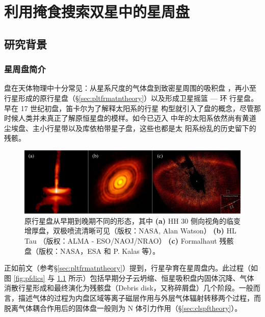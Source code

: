 \chapter{利用掩食搜索双星中的星周盘} \label{chapter:form_evo}

\section{研究背景} \label{sec:diskbackground}

\subsection{星周盘简介} \label{sec:diskintro}

盘在天体物理中十分常见：从星系尺度的气体盘\cite{Binney1987,Gilmore1989}到致密星周围的吸积盘
\cite{Pringle1981}，再小至行星形成的原行星盘（\S \ref{sec:pltfrmatntheory}）以及形成卫星摇篮 --- 环
行星盘\cite{Smith1981,Latter2017,Mosqueira2003}。早在 17 世纪初盘，笛卡尔为了解释太阳系的行星
构型就引入了盘的概念，尽管那时候人类并未真正了解原恒星盘的模样\cite{Kawabe1993}。如今已迈入
中年的太阳系依然尚有黄道尘埃盘\cite{Dermott1994}、主小行星带以及库依柏带星子盘，这些也都是太
阳系纷乱的历史留下的残骸\cite{Dohnanyi1969}。


\begin{figure}[b]
\centering
\includegraphics[width=1.0\textwidth]{figures/chapter3/f2_obsdisc.jpg}
\caption{原行星盘从早期到晚期不同的形态，其中 \textbf{(a)} HH 30 侧向视角的临变增厚盘，双极喷流清晰可见（版权：NASA, Alan Watson） \textbf{(b)} HL Tau （版权：ALMA - ESO/NAOJ/NRAO） \textbf{(c)} Formalhaut 残骸盘（版权：NASA，ESA 和 P. Kalas 等）。}
\label{fig:obsdisc}
\end{figure}


正如前文（参考\S \ref{sec:pltfrmatntheory}）提到，行星孕育在星周盘内。此过程（如图 \ref{fig:pfdics} 与 \ref{fig:obsdisc} 所示）包括早期分子云坍缩、恒星吸积盘内固体沉降、气体消散行星形成和最终演化为残骸盘（Debris disk，又称碎屑盘）几个阶段。一般而言，描述气体的过程为内盘区域等离子磁层作用与外层气体辐射转移两个过程\cite{Dullemond2010,WilliamsCieza2011}，而脱离气体耦合作用后的固体盘一般则为 N 体引力作用（\S \ref{sec:clspftheory}）。


